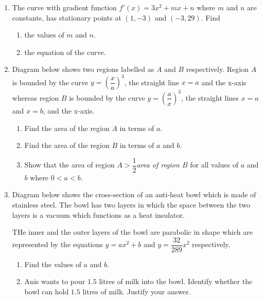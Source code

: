 \documentclass{report}
\begin{document}
\begin{multicols*}{2}
\begin{enumerate}
        \item The curve with gradient function $f'(x) = 3x^2 + mx + n$ where $m$ and $n$ are
              constants, has stationary points at $(1, -3)$ and $(-3, 29)$. Find
              \begin{enumerate}
                  \item the values of $m$ and $n$.

                  \item the equation of the curve.
              \end{enumerate}

        \item Diagram below shows two regions labelled as $A$ and $B$ respectively. Region
              $A$ is bounded by the curve $y = {\left(\dfrac{x}{a}\right)}^3$, the straight
              line $x = a$ and the x-axis whereas region $B$ is bounded by the curve $y =
                  {\left(\dfrac{a}{x}\right)}^3$, the straight lines $x = a$ and $x = b$, and the
              x-axis.
              \begin{enumerate}
                  \item Find the area of the region $A$ in terms of $a$.

                  \item Find the area of the region $B$ in terms of $a$ and $b$.

                  \item Show that the area of region $A > \dfrac{1}{2}$\textit{area of region $B$} for
                        all values of $a$ and $b$ where $0 < a < b$.
              \end{enumerate}

        \item Diagram below shows the cross-section of an anti-heat bowl which is made of
              stainless steel. The bowl has two layers in which the space between the two
              layers is a vacuum which functions as a heat insulator.

              THe inner and the outer layers of the bowl are parabolic in shape which are
              represented by the equations $y = ax^2 + b$ and $y = \dfrac{32}{289}x^2$
              respectively.
              \begin{enumerate}
                  \item Find the values of $a$ and $b$.

                  \item Anis wants to pour $1.5$ litres of milk into the bowl. Identify whether the
                        bowl can hold $1.5$ litres of milk. Justify your answer.
              \end{enumerate}


\end{enumerate}
\end{multicols*}
\end{document}
